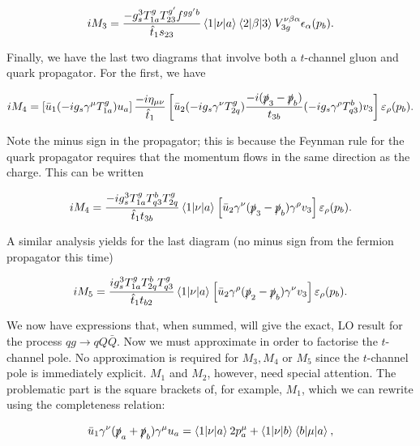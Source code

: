 \begin{equation}
iM_3 = \frac{-g_s^3 T^g_{1a} T^{g'}_{23} f^{g g' b}}{\hat{t}_1 s_{23}}  \mathinner{\langle1\vert\nu\vert a\rangle}_{} \mathinner{\langle2\vert\beta\vert3\rangle}_{} V_{3g}^{\nu \beta \alpha}\epsilon_\alpha(p_b).
\end{equation}

Finally, we have the last two diagrams that involve both a $t$-channel gluon and quark propagator. For the first, we have

\begin{equation}
iM_4 = \left[\bar{u}_1 (-i g_s \gamma^\mu T^g_{1a}) u_a \right] \frac{-i \eta_{\mu \nu}}{\hat{t}_1} \left[\bar{u}_2 (-i g_s \gamma^\nu T^g_{2q}) \frac{-i (\slashed{p}_3 - \slashed{p}_b )}{t_{3b}} (-i g_s \gamma^\rho T^b_{q3})v_3 \right] \varepsilon_\rho (p_b).
\end{equation}

Note the minus sign in the propagator; this is because the Feynman rule for the quark propagator requires that the momentum flows in the same direction as the charge. This can be written

\begin{equation}
iM_4 = \frac{-i g_s^3 T^g_{1a}T^b_{q3}T^g_{2q}}{\hat{t}_1 t_{3b}} \mathinner{\langle1\vert\nu\vert a\rangle}_{}\left[\bar{u}_2 \gamma^\nu (\slashed{p}_3 - \slashed{p}_b) \gamma^\rho v_3 \right] \varepsilon_\rho (p_b).
\end{equation}

A similar analysis yields for the last diagram (no minus sign from the fermion propagator this time)

\begin{equation}
iM_5 = \frac{i g_s^3 T^g_{1a}T^b_{2q}T^g_{q3}}{\hat{t}_1 t_{b2}} \mathinner{\langle1\vert\nu\vert a\rangle}_{}\left[\bar{u}_2 \gamma^\rho (\slashed{p}_2 - \slashed{p}_b) \gamma^\nu v_3 \right] \varepsilon_\rho (p_b).
\end{equation}

We now have expressions that, when summed, will give the exact, LO result for the process $qg \to qQ\bar{Q}$. Now we must approximate in order to factorise the $t$-channel pole. No approximation is required for $M_3, M_4$ or $M_5$ since the $t$-channel pole is immediately explicit. $M_1$ and $M_2$, however, need special attention. The problematic part is the square brackets of, for example, $M_1$, which we can rewrite using the completeness relation:

\begin{equation}
\bar{u}_1 \gamma^\nu (\slashed{p}_a + \slashed{p}_b) \gamma^\mu u_a = \mathinner{\langle1\vert\nu\vert a\rangle}_{}2 p_a^\mu + \mathinner{\langle1\vert\nu\vert b\rangle}_{} \mathinner{\langle b\vert\mu\vert a\rangle}_{},
\end{equation}

